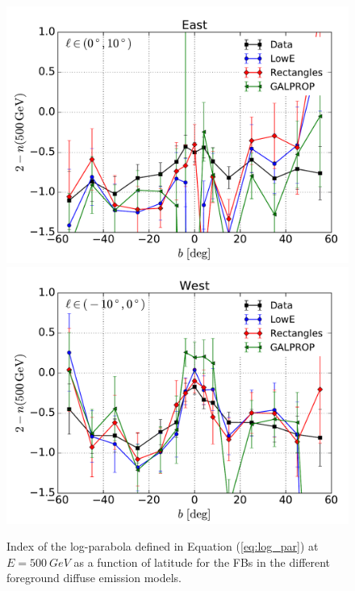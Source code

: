 \begin{figure}[h!]
\centering
\includegraphics[width=\twopic\textwidth]{plots/LogParabola_n(500GeV)_l_in_(0,10).pdf}
\includegraphics[width=\twopic\textwidth]{plots/LogParabola_n(500GeV)_l_in_(-10,0).pdf}
\caption{
Index of the log-parabola defined in Equation (\ref{eq:log_par}) at  $E = \SI{500}{GeV}$ as a function of latitude for the FBs in 
the different foreground diffuse emission models.
}
\label{fig:logpar_index}
\end{figure}

